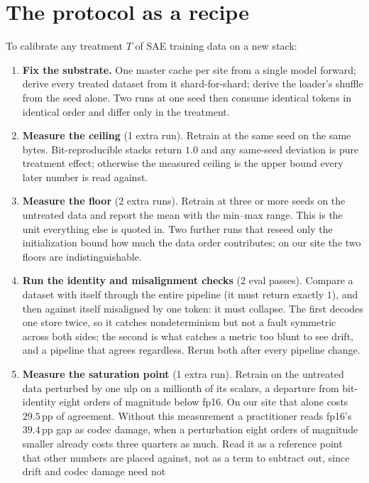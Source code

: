 \documentclass{article}
\begin{document}
\section{The protocol as a recipe}
\label{app:recipe}
To calibrate any treatment $T$ of SAE training data on a new stack:
\begin{enumerate}\setlength{\itemsep}{1pt}\setlength{\parskip}{0pt}
  \item \textbf{Fix the substrate.} One master cache per site from a
  single model forward; derive every treated dataset from it
  shard-for-shard; derive the loader's shuffle from the seed alone. Two
  runs at one seed then consume identical tokens in identical order and
  differ only in the treatment.
  \item \textbf{Measure the ceiling} (1 extra run). Retrain at the same
  seed on the same bytes. Bit-reproducible stacks return $1.0$ and any
  same-seed deviation is pure treatment effect; otherwise the measured
  ceiling is the upper bound every later number is read against.
  \item \textbf{Measure the floor} (2 extra runs). Retrain at three or
  more seeds on the untreated data and report the mean with the
  min--max range. This is the unit everything else is quoted in. Two
  further runs that reseed only the initialization bound how much the
  data order contributes; on our site the two floors are
  indistinguishable.
  \item \textbf{Run the identity and misalignment checks} (2 eval passes). Compare a
  dataset with itself through the entire pipeline (it must return
  exactly $1$), and then against itself misaligned by one token: it
  must collapse. The first decodes one store twice, so it catches nondeterminism but
  not a fault symmetric across both sides; the second is what catches a
  metric too blunt to see drift, and a pipeline that agrees regardless. Rerun both
  after every pipeline change.
  \item \textbf{Measure the saturation point} (1 extra run). Retrain on
  the untreated data perturbed by one ulp on a millionth of its scalars,
  a departure from bit-identity eight orders of magnitude below fp16.
  On our site that alone costs $29.5$\,pp of agreement. Without this
  measurement a practitioner reads fp16's $39.4$\,pp gap as codec
  damage, when a perturbation eight orders of magnitude smaller already
  costs three quarters as much. Read it as a reference point that other numbers are placed against,
  not as a term to subtract out, since drift and codec damage need not

\end{enumerate}
\end{document}
